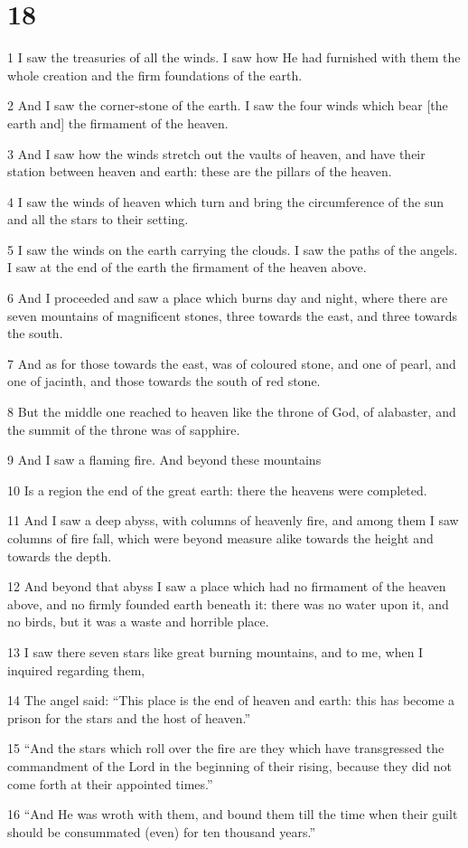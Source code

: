 \chapter{18}

\par 1 I saw the treasuries of all the winds. I saw how He had furnished with them the whole creation and the firm foundations of the earth.
\par 2 And I saw the corner-stone of the earth. I saw the four winds which bear [the earth and] the firmament of the heaven.
\par 3 And I saw how the winds stretch out the vaults of heaven, and have their station between heaven and earth: these are the pillars of the heaven.
\par 4 I saw the winds of heaven which turn and bring the circumference of the sun and all the stars to their setting.
\par 5 I saw the winds on the earth carrying the clouds. I saw the paths of the angels. I saw at the end of the earth the firmament of the heaven above.
\par 6 And I proceeded and saw a place which burns day and night, where there are seven mountains of magnificent stones, three towards the east, and three towards the south.
\par 7 And as for those towards the east, was of coloured stone, and one of pearl, and one of jacinth, and those towards the south of red stone.
\par 8 But the middle one reached to heaven like the throne of God, of alabaster, and the summit of the throne was of sapphire.
\par 9 And I saw a flaming fire. And beyond these mountains
\par 10 Is a region the end of the great earth: there the heavens were completed. 
\par 11 And I saw a deep abyss, with columns of heavenly fire, and among them I saw columns of fire fall, which were beyond measure alike towards the height and towards the depth.
\par 12 And beyond that abyss I saw a place which had no firmament of the heaven above, and no firmly founded earth beneath it: there was no water upon it, and no birds, but it was a waste and horrible place.
\par 13 I saw there seven stars like great burning mountains, and to me, when I inquired regarding them,
\par 14 The angel said: “This place is the end of heaven and earth: this has become a prison for the stars and the host of heaven.”
\par 15 “And the stars which roll over the fire are they which have transgressed the commandment of the Lord in the beginning of their rising, because they did not come forth at their appointed times.”
\par 16 “And He was wroth with them, and bound them till the time when their guilt should be consummated (even) for ten thousand years.”


